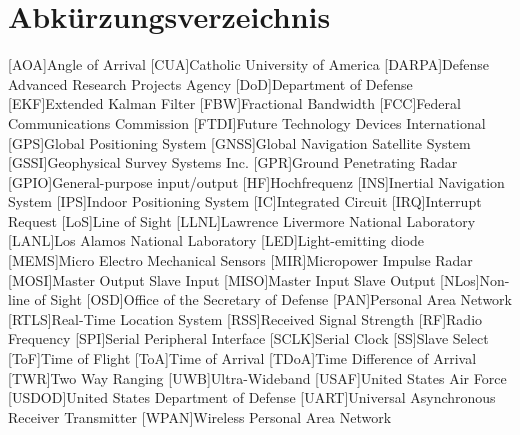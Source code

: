 %
%


\chapter*{Abkürzungsverzeichnis}
\begin{acronym}		
	[AOA]{Angle of Arrival}
	[CUA]{Catholic University of America}
	[DARPA]{Defense Advanced Research Projects Agency}
	[DoD]{Department of Defense}
	[EKF]{Extended Kalman Filter}
	[FBW]{Fractional Bandwidth}
	[FCC]{Federal Communications Commission}
	[FTDI]{Future Technology Devices International}
	[GPS]{Global Positioning System}
	[GNSS]{Global Navigation Satellite System}
	[GSSI]{Geophysical Survey Systems Inc.}
	[GPR]{Ground Penetrating Radar}
	[GPIO]{General-purpose input/output}	%
	[HF]{Hochfrequenz}
	[INS]{Inertial Navigation System}
	[IPS]{Indoor Positioning System}
	[IC]{Integrated Circuit}	%
	[IRQ]{Interrupt Request}
	[LoS]{Line of Sight}
	[LLNL]{Lawrence Livermore National Laboratory}
	[LANL]{Los Alamos National Laboratory}
	[LED]{Light-emitting diode} %
	[MEMS]{Micro Electro Mechanical Sensors}
	[MIR]{Micropower Impulse Radar}
	[MOSI]{Master Output Slave Input}
	[MISO]{Master Input Slave Output}
	[NLos]{Non-line of Sight}
	[OSD]{Office of the Secretary of Defense}
	[PAN]{Personal Area Network}
	[RTLS]{Real-Time Location System}
	[RSS]{Received Signal Strength}
	[RF]{Radio Frequency}
	[SPI]{Serial Peripheral Interface}
	[SCLK]{Serial Clock}
	[SS]{Slave Select}
	[ToF]{Time of Flight}
	[ToA]{Time of Arrival}
	[TDoA]{Time Difference of Arrival}
	[TWR]{Two Way Ranging}
	[UWB]{Ultra-Wideband} %
	[USAF]{United States Air Force}
	[USDOD]{United States Department of Defense} %
	[UART]{Universal Asynchronous Receiver Transmitter}
	[WPAN]{Wireless Personal Area Network}

\end{acronym}